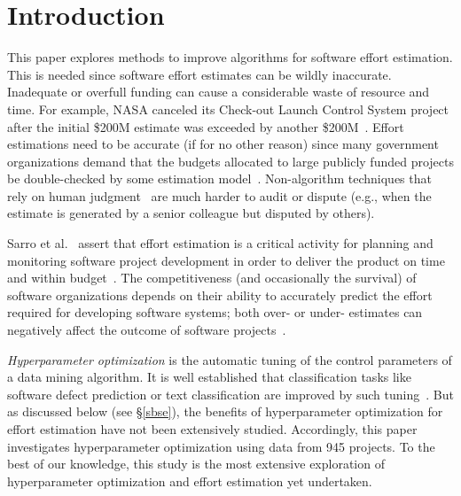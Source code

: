 \section{Introduction}
\label{intro}
This paper explores methods to improve algorithms
for software effort estimation.
This is needed since software  effort estimates   can be 
wildly inaccurate\cite{kemerer1987empirical}. Inadequate or overfull funding can cause a considerable waste of resource and time. For example, NASA canceled its  Check-out Launch Control System project after the initial \$200M estimate was exceeded by another \$200M~\cite{cowing02}. Effort estimations need to be accurate  (if for
no other reason) since many government
organizations demand that the budgets allocated to
large publicly funded projects be double-checked by some estimation model~\cite{MenziesNeg:2017}.  
Non-algorithm techniques that rely on human judgment~\cite{jorgensen2004review} are much harder to  
audit or 
dispute (e.g.,  when the estimate is generated by a senior colleague but disputed by others). 

Sarro et al.~\cite{sarro2016multi} assert that effort  estimation  is  a  critical  activity  for  planning  and
monitoring software project development in order to deliver
the  product  on  time  and  within  budget~\cite{briand2002resource,kocaguneli2011experiences,trendowicz2014software}.   The
competitiveness (and occasionally the survival) of software
organizations depends on their ability to accurately predict
the  effort  required  for  developing  software  systems;  both
over- or under- estimates can negatively affect the outcome
of software projects~\cite{trendowicz2014software,mcconnell2006software,mendes2002further,sommerville2010software}.



{\em Hyperparameter optimization}  is the automatic tuning
of the control parameters of a data
mining algorithm.
It is well established that  classification tasks like software defect prediction or 
 text classification are improved by such tuning~\cite{Fu2016TuningFS,tanti18,AGRAWAL2018,agrawal2017better}.
But as discussed below (see  \S\ref{sbse}), the  benefits of     hyperparameter optimization for   effort estimation 
have not been extensively
studied.  Accordingly, this paper investigates hyperparameter optimization using data from 945   projects.
To the best of our knowledge,
this study is the most extensive exploration  of
hyperparameter optimization and effort estimation yet undertaken. 

